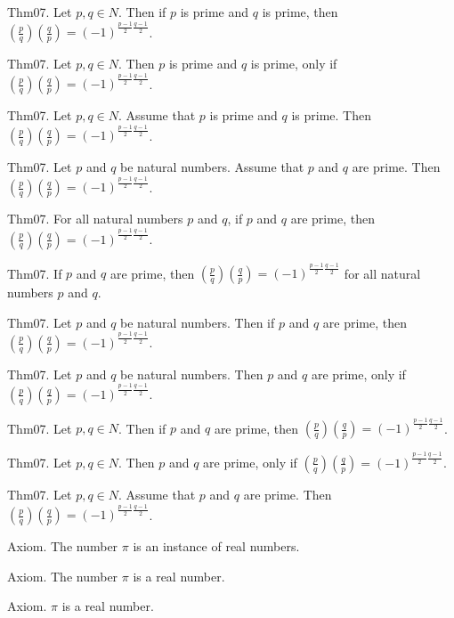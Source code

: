 \documentclass{article}
\begin{document}
Thm07. Let $p , q \in N$. Then if $p$ is prime and $q$ is prime, then $\left(\frac{ p }{ q }\right) \left(\frac{ q }{ p }\right) = (- 1)^ {\frac{ p - 1}{2}\frac{ q - 1}{2}}$.

Thm07. Let $p , q \in N$. Then $p$ is prime and $q$ is prime, only if $\left(\frac{ p }{ q }\right) \left(\frac{ q }{ p }\right) = (- 1)^ {\frac{ p - 1}{2}\frac{ q - 1}{2}}$.

Thm07. Let $p , q \in N$. Assume that $p$ is prime and $q$ is prime. Then $\left(\frac{ p }{ q }\right) \left(\frac{ q }{ p }\right) = (- 1)^ {\frac{ p - 1}{2}\frac{ q - 1}{2}}$.

Thm07. Let $p$ and $q$ be natural numbers. Assume that $p$ and $q$ are prime. Then $\left(\frac{ p }{ q }\right) \left(\frac{ q }{ p }\right) = (- 1)^ {\frac{ p - 1}{2}\frac{ q - 1}{2}}$.

Thm07. For all natural numbers $p$ and $q$, if $p$ and $q$ are prime, then $\left(\frac{ p }{ q }\right) \left(\frac{ q }{ p }\right) = (- 1)^ {\frac{ p - 1}{2}\frac{ q - 1}{2}}$.

Thm07. If $p$ and $q$ are prime, then $\left(\frac{ p }{ q }\right) \left(\frac{ q }{ p }\right) = (- 1)^ {\frac{ p - 1}{2}\frac{ q - 1}{2}}$ for all natural numbers $p$ and $q$.

Thm07. Let $p$ and $q$ be natural numbers. Then if $p$ and $q$ are prime, then $\left(\frac{ p }{ q }\right) \left(\frac{ q }{ p }\right) = (- 1)^ {\frac{ p - 1}{2}\frac{ q - 1}{2}}$.

Thm07. Let $p$ and $q$ be natural numbers. Then $p$ and $q$ are prime, only if $\left(\frac{ p }{ q }\right) \left(\frac{ q }{ p }\right) = (- 1)^ {\frac{ p - 1}{2}\frac{ q - 1}{2}}$.

Thm07. Let $p , q \in N$. Then if $p$ and $q$ are prime, then $\left(\frac{ p }{ q }\right) \left(\frac{ q }{ p }\right) = (- 1)^ {\frac{ p - 1}{2}\frac{ q - 1}{2}}$.

Thm07. Let $p , q \in N$. Then $p$ and $q$ are prime, only if $\left(\frac{ p }{ q }\right) \left(\frac{ q }{ p }\right) = (- 1)^ {\frac{ p - 1}{2}\frac{ q - 1}{2}}$.

Thm07. Let $p , q \in N$. Assume that $p$ and $q$ are prime. Then $\left(\frac{ p }{ q }\right) \left(\frac{ q }{ p }\right) = (- 1)^ {\frac{ p - 1}{2}\frac{ q - 1}{2}}$.

Axiom. The number \(\pi\) is an instance of real numbers.

Axiom. The number \(\pi\) is a real number.

Axiom. $\pi$ is a real number.
\end{document}
